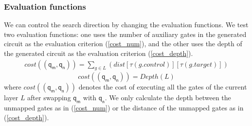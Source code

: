 \documentclass[journal]{IEEEtran}
\begin{document}
	\subsubsection{Evaluation functions}
	We can control the search direction by changing the evaluation functions.
	We test two evaluation functions: one uses the number of auxiliary gates in the generated circuit as the evaluation criterion (\ref{cost_num}),  and the other uses the depth of the generated circuit as the evaluation criterion  (\ref{cost_depth}).
	\begin{equation}
		\begin{aligned}
			cost((\textsf{q}_\textsf{m},\textsf{q}_\textsf{n}))=\sum_{g \in L}(dist[\tau(g.control)][\tau(g.target)])
			\label{cost_num}
		\end{aligned}
	\end{equation}
	\begin{equation}
		cost((\textsf{q}_\textsf{m},\textsf{q}_\textsf{n}))= Depth(L)
		\label{cost_depth}
	\end{equation}
	where $cost((\textsf{q}_\textsf{m},\textsf{q}_\textsf{n}))$ denotes the cost of executing all the gates of the current layer $L$ 
	after swapping $\textsf{q}_\textsf{m}$ with $\textsf{q}_\textsf{n}$. We only calculate the depth between the unmapped gates as in (\ref{cost_num}) or the distance of the unmapped gates as in (\ref{cost_depth}).
	
\end{document}

